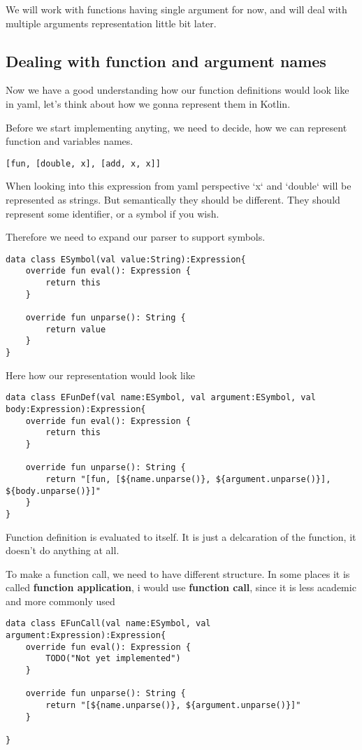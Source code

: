 \documentclass[11pt]{article}
\begin{document}
We will work with functions having single argument for now, and will deal with multiple arguments representation little bit later.

\subsection{Dealing with function and argument names}
\label{sec:org53aad1f}
Now we have a good understanding how our function definitions would look like in yaml, let's think about how we gonna represent them in Kotlin.

Before we start implementing anyting, we need to decide, how we can represent function and variables names.

\begin{verbatim}
[fun, [double, x], [add, x, x]]
\end{verbatim}

When looking into this expression from yaml perspective `x` and `double` will be represented as strings.
But semantically they should be different. They should represent some identifier, or a symbol if you wish.

Therefore we need to expand our parser to support symbols.

\begin{verbatim}
data class ESymbol(val value:String):Expression{
    override fun eval(): Expression {
        return this
    }

    override fun unparse(): String {
        return value
    }
}

\end{verbatim}

Here how our representation would look like
\begin{verbatim}
data class EFunDef(val name:ESymbol, val argument:ESymbol, val body:Expression):Expression{
    override fun eval(): Expression {
        return this
    }

    override fun unparse(): String {
        return "[fun, [${name.unparse()}, ${argument.unparse()}], ${body.unparse()}]"
    }
}

\end{verbatim}

Function definition is evaluated to itself. It is just a delcaration of the function, it doesn't do anything at all.

To make a function call, we need to have different structure. In some places it is called \textbf{function application}, i would use \textbf{function call}, since it is less academic and more commonly used
\begin{verbatim}
data class EFunCall(val name:ESymbol, val argument:Expression):Expression{
    override fun eval(): Expression {
        TODO("Not yet implemented")
    }

    override fun unparse(): String {
        return "[${name.unparse()}, ${argument.unparse()}]"
    }

}
\end{verbatim}
\end{document}
